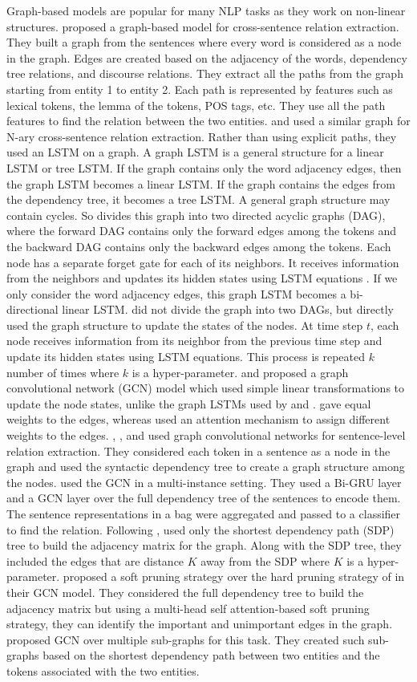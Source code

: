 Graph-based models are popular for many NLP tasks as they work on non-linear structures.  proposed a graph-based model for cross-sentence relation extraction. They built a graph from the sentences where every word is considered as a node in the graph. Edges are created based on the adjacency of the words, dependency tree relations, and discourse relations. They extract all the paths from the graph starting from entity 1 to entity 2. Each path is represented by features such as lexical tokens, the lemma of the tokens, POS tags, etc. They use all the path features to find the relation between the two entities. 
 and  used a similar graph for N-ary cross-sentence relation extraction. Rather than using explicit paths, they used an LSTM on a graph. A graph LSTM is a general structure for a linear LSTM or tree LSTM. If the graph contains only the word adjacency edges, then the graph LSTM becomes a linear LSTM. If the graph contains the edges from the dependency tree, it becomes a tree LSTM. A general graph structure may contain cycles. So  divides this graph into two directed acyclic graphs (DAG), where the forward DAG contains only the forward edges among the tokens and the backward DAG contains only the backward edges among the tokens. Each node has a separate forget gate for each of its neighbors. It receives information from the neighbors and updates its hidden states using LSTM equations . If we only consider the word adjacency edges, this graph LSTM becomes a bi-directional linear LSTM.  did not divide the graph into two DAGs, but directly used the graph structure to update the states of the nodes. At time step $t$, each node receives information from its neighbor from the previous time step and update its hidden states using LSTM equations. This process is repeated $k$ number of times where $k$ is a hyper-parameter.
 and  proposed a graph convolutional network (GCN) model which used simple linear transformations to update the node states, unlike the graph LSTMs used by  and .  gave equal weights to the edges, whereas  used an attention mechanism to assign different weights to the edges. , , and  used graph convolutional networks for sentence-level relation extraction. They considered each token in a sentence as a node in the graph and used the syntactic dependency tree to create a graph structure among the nodes.  used the GCN in a multi-instance setting. They used a Bi-GRU layer and a GCN layer over the full dependency tree of the sentences to encode them. The sentence representations in a bag were aggregated and passed to a classifier to find the relation. Following ,  used only the shortest dependency path (SDP) tree to build the adjacency matrix for the graph. Along with the SDP tree, they included the edges that are distance $K$ away from the SDP where $K$ is a hyper-parameter.  proposed a soft pruning strategy over the hard pruning strategy of  in their GCN model. They considered the full dependency tree to build the adjacency matrix but using a multi-head self attention-based soft pruning strategy, they can identify the important and unimportant edges in the graph.  proposed GCN over multiple sub-graphs for this task. They created such sub-graphs based on the shortest dependency path between two entities and the tokens associated with the two entities.
